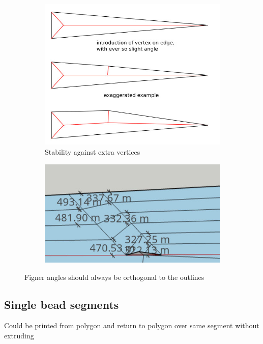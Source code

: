 \begin{figure}[H]
\begin{subfigure}{0.45\columnwidth}
\includegraphics[width=\columnwidth]{sources/method/finger_angles.jpg}
\caption{Stability against extra vertices}
\label{finger_angles_stability}
\end{subfigure}
\begin{subfigure}{0.45\columnwidth}
\includegraphics[width=\columnwidth]{sources/method/finger_angles_2.jpg}
\end{subfigure}
\caption{Figner angles should always be orthogonal to the outlines}
\label{finger_angles}
\end{figure}



\subsection{Single bead segments}
Could be printed from polygon and return to polygon over same segment without extruding

